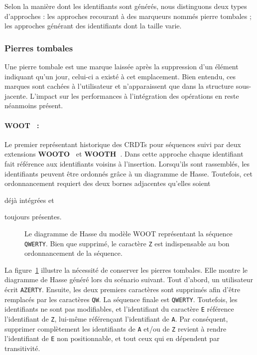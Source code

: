 Selon la manière dont les identifiants sont générés, nous distinguons deux types
d'approches : les approches recourant à des marqueurs nommés \og pierre tombales
\fg; les approches générant des identifiants dont la taille varie.

\subsubsection{Pierres tombales}

Une \og pierre tombale \fg est une marque laissée après la suppression d'un
élément indiquant qu'un jour, celui-ci a existé à cet emplacement. Bien entendu,
ces marques sont cachées à l'utilisateur et n'apparaissent que dans la structure
sous-jacente. L'impact sur les performances à l'intégration des opérations en
reste néanmoins présent.

\paragraph{WOOT~\cite{oster2006data} :} Le premier représentant historique des
CRDTs pour séquences suivi par deux extensions
\textbf{WOOTO~\cite{weiss2007wooki}} et
\textbf{WOOTH~\cite{ahmed2011evaluating}}. Dans cette approche chaque
identifiant fait référence aux identifiants voisins à l'insertion.  Lorsqu'ils
sont rassemblés, les identifiants peuvent être ordonnés grâce à un diagramme de
Hasse. Toutefois, cet ordonnancement requiert des deux bornes adjacentes
qu'elles soient
\begin{inparaenum}[(i)]
\item déjà intégrées et
\item toujours présentes.
\end{inparaenum}

\begin{figure}
  \centering
  
  \caption[Diagramme de Hasse dans WOOT]
  {\label{repl:fig:wootexample}Le diagramme de Hasse du modèle WOOT représentant
    la séquence \texttt{QWERTY}. Bien que supprimé, le caractère \texttt{Z} est
    indispensable au bon ordonnancement de la séquence.}
\end{figure}

\noindent La figure~\ref{repl:fig:wootexample} illustre la nécessité de
conserver les pierres tombales. Elle montre le diagramme de Hasse généré lors du
scénario suivant. Tout d'abord, un utilisateur écrit \texttt{AZERTY}. Ensuite,
les deux premiers caractères sont supprimés afin d'être remplacés par les
caractères \texttt{QW}. La séquence finale est \texttt{QWERTY}. Toutefois, les
identifiants ne sont pas modifiables, et l'identifiant du caractère \texttt{E}
référence l'identifiant de \texttt{Z}, lui-même référençant l'identifiant de
\texttt{A}. Par conséquent, supprimer complètement les identifiants de
\texttt{A} et/ou de \texttt{Z} revient à rendre l'identifiant de \texttt{E} non
positionnable, et tout ceux qui en dépendent par transitivité.

